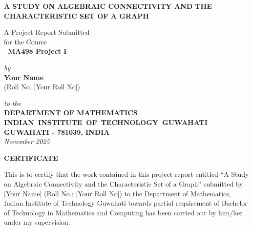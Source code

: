 \documentclass[12pt,a4paper]{report}
\theoremstyle{plain}
\theoremstyle{definition}
\theoremstyle{remark}
\begin{document}
\begin{titlepage}
\enlargethispage{3cm}

\begin{center}

\vspace*{-2cm}

\textbf{\Large A STUDY ON ALGEBRAIC CONNECTIVITY AND THE CHARACTERISTIC SET OF A GRAPH}

\vfill

 A Project Report Submitted \\
for the Course \\[1cm]

{\bf\Large\ MA498 Project I }\\[.1in]

 \vfill

{\large \emph{by}}\\[5pt]
{\large\bf {Your Name}}\\[5pt]
{\large (Roll No. [Your Roll No])}

\vfill

\vspace*{0.5cm}

{\em\large to the}\\[10pt]
{\bf\large DEPARTMENT OF MATHEMATICS} \\[5pt]
{\bf\large \mbox{INDIAN INSTITUTE OF TECHNOLOGY GUWAHATI}}\\[5pt]
{\bf\large GUWAHATI - 781039, INDIA}\\[10pt]
{\it\large November 2025}
\end{center}

\end{titlepage}

\clearpage

 \setcounter{page}{2}
\begin{center}
{\Large{\bf{CERTIFICATE}}}
\end{center}


\noindent
This is to certify that the work contained in this project report entitled 
``A Study on Algebraic Connectivity and the Characteristic Set of a Graph'' submitted by [Your Name] (Roll No.: [Your Roll No]) 
to the Department of Mathematics, Indian Institute of Technology Guwahati towards partial requirement of Bachelor of Technology in Mathematics and Computing has been carried out by him/her under my supervision. \\
\end{document}
